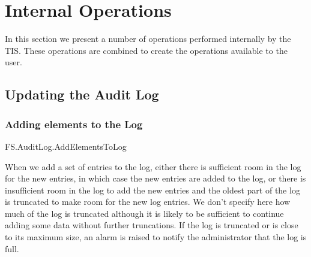 \chapter{Internal Operations}
\label{sec:Internal}
In this section we present a number of operations performed internally
by the TIS. These operations are combined to create the operations
available to the user.

\section{Updating the Audit Log}

\subsection{Adding elements to the Log}

\begin{traceunit}{FS.AuditLog.AddElementsToLog}
\end{traceunit}


When we add a set of entries to the log, either there is sufficient
room in the log for the new entries, in which case the new entries are
added to the log, or there is insufficient room in the log to add the
new entries and the oldest part of the log is truncated to make room
for the new log entries. 
We don't specify here how much of the log is truncated
although it is likely to be sufficient to continue adding some data
without further truncations.
If the log is truncated or is close to its maximum size, an alarm is raised 
to notify the administrator that the log is full. 

